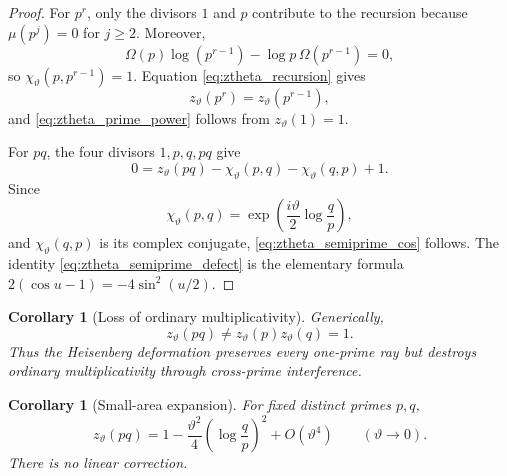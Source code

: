 \documentclass[11pt]{amsart}
\numberwithin{equation}{section}
\theoremstyle{plain}
\newtheorem{corollary}[theorem]{Corollary}
\theoremstyle{definition}
\theoremstyle{remark}
\newcommand{\Om}{\Omega}
\begin{document}
\begin{proof}
For $p^r$, only the divisors $1$ and $p$ contribute to the recursion because
$\mu(p^j)=0$ for $j\ge2$.  Moreover,
\begin{equation}
\Om(p)\log(p^{r-1})
-
\log p\,\Om(p^{r-1})
=0,
\label{eq:prime_power_symplectic_zero}
\end{equation}
so $\chi_{\vartheta}(p,p^{r-1})=1$.  Equation
\eqref{eq:ztheta_recursion} gives
\begin{equation}
z_{\vartheta}(p^r)=z_{\vartheta}(p^{r-1}),
\label{eq:prime_power_recursion}
\end{equation}
and \eqref{eq:ztheta_prime_power} follows from $z_{\vartheta}(1)=1$.

For $pq$, the four divisors $1,p,q,pq$ give
\begin{equation}
0
=
z_{\vartheta}(pq)
-
\chi_{\vartheta}(p,q)
-
\chi_{\vartheta}(q,p)
+1.
\label{eq:pq_inverse_equation}
\end{equation}
Since
\begin{equation}
\chi_{\vartheta}(p,q)
=
\exp\!\left(\frac{i\vartheta}{2}\log\frac{q}{p}\right),
\label{eq:chi_pq}
\end{equation}
and $\chi_{\vartheta}(q,p)$ is its complex conjugate,
\eqref{eq:ztheta_semiprime_cos} follows.  The identity
\eqref{eq:ztheta_semiprime_defect} is the elementary formula
$2(\cos u-1)=-4\sin^2(u/2)$.
\end{proof}

\begin{corollary}[Loss of ordinary multiplicativity]
\label{cor:loss_of_multiplicativity}
Generically,
\begin{equation}
z_{\vartheta}(pq)
\neq
z_{\vartheta}(p)z_{\vartheta}(q)=1.
\label{eq:loss_of_multiplicativity}
\end{equation}
Thus the Heisenberg deformation preserves every one-prime ray but destroys
ordinary multiplicativity through cross-prime interference.
\end{corollary}

\begin{corollary}[Small-area expansion]
\label{cor:small_area_expansion}
For fixed distinct primes $p,q$,
\begin{equation}
z_{\vartheta}(pq)
=
1-
\frac{\vartheta^2}{4}
\left(\log\frac{q}{p}\right)^2
+O(\vartheta^4)
\qquad(\vartheta\to0).
\label{eq:small_theta_pq}
\end{equation}
There is no linear correction.
\end{corollary}
\end{document}
